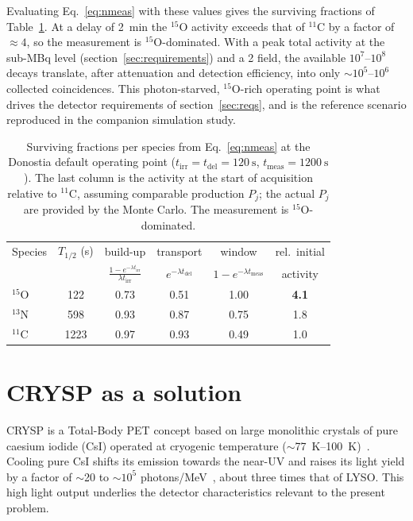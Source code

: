 \documentclass{iopjournal}
\begin{document}
Evaluating Eq.~\eqref{eq:nmeas} with these values gives the surviving fractions
of Table~\ref{tab:donostia}. At a delay of \SI{2}{\minute} the $^{15}$O activity
exceeds that of $^{11}$C by a factor of $\approx 4$, so the measurement is
$^{15}$O-dominated. With a peak total activity at the sub-MBq level
(section~\ref{sec:requirements}) and a \SI{2}{\Gy} field, the available
$10^{7}$--$10^{8}$ decays translate, after attenuation and detection efficiency,
into only $\sim 10^{5}$--$10^{6}$ collected coincidences. This photon-starved,
$^{15}$O-rich operating point is what drives the detector requirements of
section~\ref{sec:reqs}, and is the reference scenario reproduced in the companion
simulation study.

\begin{table}[htbp]
\centering
\caption{Surviving fractions per species from Eq.~\eqref{eq:nmeas} at the
Donostia default operating point ($t_{\mathrm{irr}}=t_{\mathrm{del}}=\SI{120}{\second}$,
$t_{\mathrm{meas}}=\SI{1200}{\second}$). The last column is the activity at the
start of acquisition relative to $^{11}$C, assuming comparable production $P_j$;
the actual $P_j$ are provided by the Monte Carlo. The measurement is
$^{15}$O-dominated.}
\label{tab:donostia}
\begin{tabular}{lccccc}
\hline
Species & $T_{1/2}$ (s) & build-up & transport & window & rel.\ initial \\
        &               & $\frac{1-e^{-\lambda t_{\mathrm{irr}}}}{\lambda t_{\mathrm{irr}}}$ & $e^{-\lambda t_{\mathrm{del}}}$ & $1-e^{-\lambda t_{\mathrm{meas}}}$ & activity \\
\hline
$^{15}$O & 122  & 0.73 & 0.51 & 1.00 & \textbf{4.1} \\
$^{13}$N & 598  & 0.93 & 0.87 & 0.75 & 1.8 \\
$^{11}$C & 1223 & 0.97 & 0.93 & 0.49 & 1.0 \\
\hline
\end{tabular}
\end{table}

\section{CRYSP as a solution}
\label{sec:crysp}

CRYSP is a Total-Body PET concept based on large monolithic crystals of
pure caesium iodide (CsI) operated at cryogenic temperature
($\sim$\SIrange{77}{100}{\kelvin})~\cite{Soleti:2024flw}. Cooling pure CsI
shifts its emission towards the near-UV and raises its light yield by a factor
of $\sim$20 to $\sim 10^{5}$ photons/MeV~\cite{mikhailik2015luminescence},
about three times that of LYSO. This high light output underlies the
detector characteristics relevant to the present problem.
\end{document}
